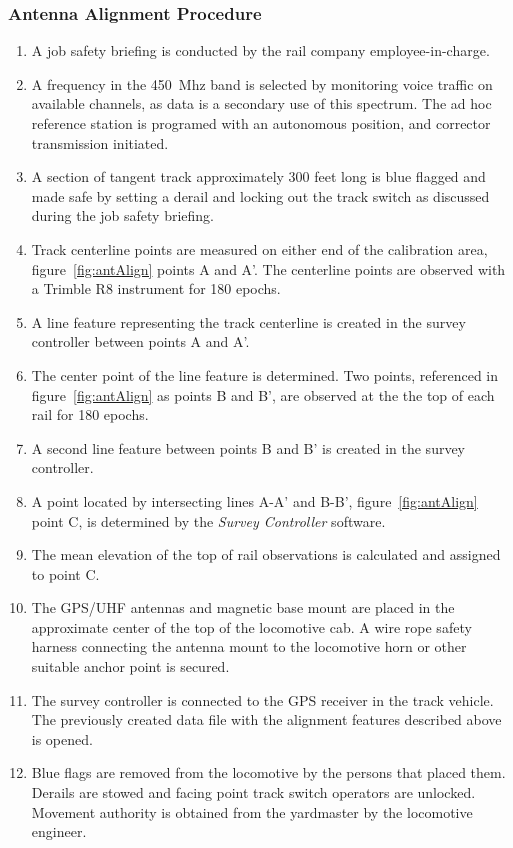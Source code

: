 \subsubsection{Antenna Alignment Procedure}
\label{Antenna Alignment}
\begin{enumerate}
\item A job safety briefing is conducted by the rail company employee-in-charge.
\item A frequency in the 450~Mhz band is selected by monitoring voice traffic on available channels, as data is a secondary use of this spectrum. The ad hoc reference station is programed with an autonomous position, and corrector transmission initiated.
\item  A section of tangent track approximately 300 feet long is blue flagged and made safe by setting a derail and locking out the track switch as discussed during the job safety briefing.
\item Track centerline points are measured on either end of the calibration area, figure~\ref{fig:antAlign} points A and A'. The centerline points are observed with a Trimble R8 instrument for 180 epochs.
\item A line feature representing the track centerline is created in the survey controller between points A and A'.
\item The center point of the line feature is determined. Two points, referenced in figure~\ref{fig:antAlign} as points B and B', are observed at the the top of each rail for 180 epochs.
\item A second line feature between points B and B' is created in the survey controller.
\item A point located by intersecting lines A-A' and B-B', figure~\ref{fig:antAlign} point C, is determined by the \emph{Survey Controller} software.
\item The mean elevation of the top of rail observations is calculated and assigned to point C.
\item The GPS/UHF antennas and magnetic base mount are placed in the approximate center of the top of the locomotive cab. A wire rope safety harness connecting the antenna mount to the locomotive horn or other suitable anchor point is secured.
\item The survey controller is connected to the GPS receiver in the track vehicle. The previously created data file with the alignment features described above is opened.
\item Blue flags are removed from the locomotive by the persons that placed them. Derails are stowed and facing point track switch operators are unlocked. Movement authority is obtained from the yardmaster by the locomotive engineer.

\end{enumerate}
